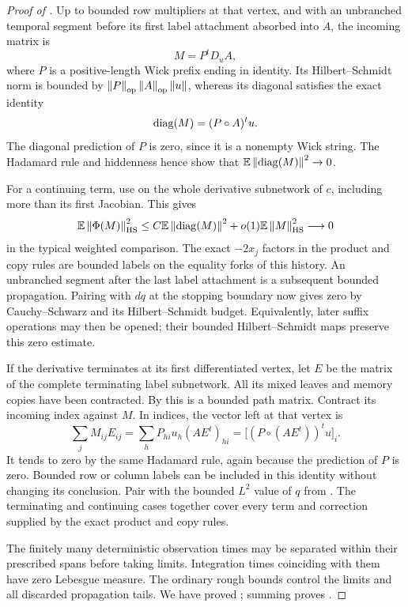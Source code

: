 \begin{proof}[Proof of ]
Up to bounded row multipliers at that vertex, and with an unbranched
temporal segment before its first label attachment absorbed into
$A$, the incoming matrix is
\begin{equation}\label{eq:hidden-first-vertex-matrix}
 M=P^tD_uA,
\end{equation}
where $P$ is a positive-length Wick prefix ending in identity. Its
Hilbert--Schmidt norm is bounded by
$\left\lVert P\right\rVert_{\mathrm{op}}\left\lVert A\right\rVert_{\mathrm{op}}\left\lVert u\right\rVert$, whereas its diagonal satisfies
the exact identity
\begin{equation}\label{eq:hidden-diagonal-cancellation}
 \operatorname{diag}(M)=(P\circ A)^tu.
\end{equation}
The diagonal prediction of $P$ is zero, since it is a nonempty Wick
string. The Hadamard rule and hiddenness hence show that
$\mathbb E\left\lVert \operatorname{diag}(M)\right\rVert^2\to0$.

For a continuing term, use  on the
whole derivative subnetwork of $c$, including more than its first
Jacobian. This gives
\begin{equation}\label{eq:hidden-schur-small}
 \mathbb E\left\lVert \Phi(M)\right\rVert_{\mathrm{HS}}^2
 \leq C\mathbb E\left\lVert \operatorname{diag}(M)\right\rVert^2
       +o(1)\mathbb E\left\lVert M\right\rVert_{\mathrm{HS}}^2
 \longrightarrow0
\end{equation}
in the typical weighted comparison. The exact $-2x_j$ factors in
the product and copy rules are bounded labels on the equality
forks of this history. An unbranched segment after the last label
attachment is a subsequent bounded propagation. Pairing with $dq$
at the stopping boundary now gives zero by Cauchy--Schwarz and its
Hilbert--Schmidt budget. Equivalently, later suffix operations may
then be opened; their bounded Hilbert--Schmidt maps preserve this
zero estimate.

If the derivative terminates at its first differentiated vertex,
let $E$ be the matrix of the complete terminating label subnetwork.
All its mixed leaves and memory copies have been contracted.
By  this is a bounded path matrix.
Contract its incoming index against $M$. In indices, the vector left
at that vertex is
\[
 \sum_j M_{ij}E_{ij}
 =\sum_h P_{hi}u_h(AE^t)_{hi}
 =\bigl[(P\circ(AE^t))^tu\bigr]_i.
\]
It tends to zero by the same Hadamard rule, again because the
prediction of $P$ is zero. Bounded row or column labels can be included
in this identity without changing its conclusion. Pair with the
bounded $L^2$ value of $q$ from .
The terminating and continuing cases together cover every term and
correction supplied by the exact product and copy rules.

The finitely many deterministic observation times may be separated
within their prescribed spans before taking limits. Integration times
coinciding with them have zero Lebesgue measure. The ordinary rough
bounds control the limits and all discarded propagation tails. We
have proved ; summing
 proves
.
\end{proof}

